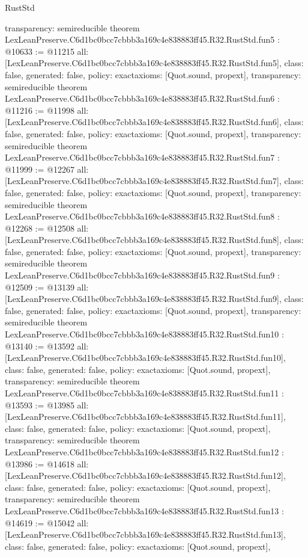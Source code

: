 \begin{lexlean}{RustStd}
\begin{coremodule}
{  transparency: semireducible
}
theorem LexLeanPreserve.C6d1bc0bcc7cbbb3a169c4e838883ff45.R32.RustStd.fun5 : @10633 := @11215 {
  all: [LexLeanPreserve.C6d1bc0bcc7cbbb3a169c4e838883ff45.R32.RustStd.fun5],
  class: false,
  generated: false,
  policy: exact{axioms: [Quot.sound, propext]},
  transparency: semireducible
}
theorem LexLeanPreserve.C6d1bc0bcc7cbbb3a169c4e838883ff45.R32.RustStd.fun6 : @11216 := @11998 {
  all: [LexLeanPreserve.C6d1bc0bcc7cbbb3a169c4e838883ff45.R32.RustStd.fun6],
  class: false,
  generated: false,
  policy: exact{axioms: [Quot.sound, propext]},
  transparency: semireducible
}
theorem LexLeanPreserve.C6d1bc0bcc7cbbb3a169c4e838883ff45.R32.RustStd.fun7 : @11999 := @12267 {
  all: [LexLeanPreserve.C6d1bc0bcc7cbbb3a169c4e838883ff45.R32.RustStd.fun7],
  class: false,
  generated: false,
  policy: exact{axioms: [Quot.sound, propext]},
  transparency: semireducible
}
theorem LexLeanPreserve.C6d1bc0bcc7cbbb3a169c4e838883ff45.R32.RustStd.fun8 : @12268 := @12508 {
  all: [LexLeanPreserve.C6d1bc0bcc7cbbb3a169c4e838883ff45.R32.RustStd.fun8],
  class: false,
  generated: false,
  policy: exact{axioms: [Quot.sound, propext]},
  transparency: semireducible
}
theorem LexLeanPreserve.C6d1bc0bcc7cbbb3a169c4e838883ff45.R32.RustStd.fun9 : @12509 := @13139 {
  all: [LexLeanPreserve.C6d1bc0bcc7cbbb3a169c4e838883ff45.R32.RustStd.fun9],
  class: false,
  generated: false,
  policy: exact{axioms: [Quot.sound, propext]},
  transparency: semireducible
}
theorem LexLeanPreserve.C6d1bc0bcc7cbbb3a169c4e838883ff45.R32.RustStd.fun10 : @13140 := @13592 {
  all: [LexLeanPreserve.C6d1bc0bcc7cbbb3a169c4e838883ff45.R32.RustStd.fun10],
  class: false,
  generated: false,
  policy: exact{axioms: [Quot.sound, propext]},
  transparency: semireducible
}
theorem LexLeanPreserve.C6d1bc0bcc7cbbb3a169c4e838883ff45.R32.RustStd.fun11 : @13593 := @13985 {
  all: [LexLeanPreserve.C6d1bc0bcc7cbbb3a169c4e838883ff45.R32.RustStd.fun11],
  class: false,
  generated: false,
  policy: exact{axioms: [Quot.sound, propext]},
  transparency: semireducible
}
theorem LexLeanPreserve.C6d1bc0bcc7cbbb3a169c4e838883ff45.R32.RustStd.fun12 : @13986 := @14618 {
  all: [LexLeanPreserve.C6d1bc0bcc7cbbb3a169c4e838883ff45.R32.RustStd.fun12],
  class: false,
  generated: false,
  policy: exact{axioms: [Quot.sound, propext]},
  transparency: semireducible
}
theorem LexLeanPreserve.C6d1bc0bcc7cbbb3a169c4e838883ff45.R32.RustStd.fun13 : @14619 := @15042 {
  all: [LexLeanPreserve.C6d1bc0bcc7cbbb3a169c4e838883ff45.R32.RustStd.fun13],
  class: false,
  generated: false,
  policy: exact{axioms: [Quot.sound, propext]},
}
\end{coremodule}
\end{lexlean}
